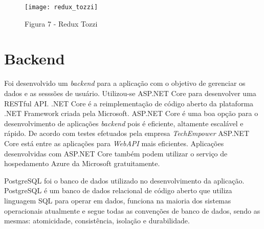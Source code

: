 \begin{figure}[htb]
	\caption{\label{fig:redux}Figura 7 - Redux Tozzi}
	\begin{center}
		\texttt{[image: redux\_tozzi]}
	\end{center}
\end{figure}





\section{Backend}
Foi desenvolvido um \textit{backend} para a aplicação com o objetivo de gerenciar os dados e as sesssões de usuário. Utilizou-se ASP.NET Core para desenvolver uma RESTful API. .NET Core é a reimplementação de código aberto da plataforma .NET Framework criada pela Microsoft. ASP.NET Core é uma boa opção para o desenvolvimento de aplicações \textit{backend} pois é eficiente, altamente escalável e rápido. De acordo com testes efetuados pela empresa \textit{TechEmpower} ASP.NET Core está entre as aplicações para \textit{WebAPI} mais eficientes. Aplicações desenvolvidas com ASP.NET Core também podem utilizar o serviço de hospedamento Azure da Microsoft gratuitamente. 

PostgreSQL foi o banco de dados utilizado no desenvolvimento da aplicação. PostgreSQL é um banco de dados relacional de código aberto que utiliza linguagem SQL para operar em dados, funciona na maioria dos sistemas operacionais atualmente e segue todas as convenções de banco de dados, sendo as mesmas: atomicidade, consistência, isolação e durabilidade.

